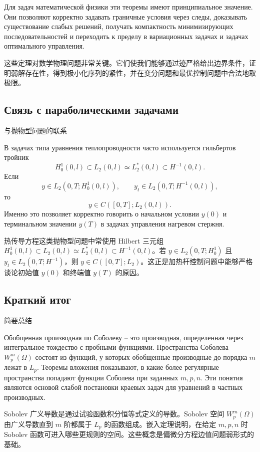 \documentclass[12pt,a4paper]{article}
\newcommand{\zh}[1]{\par\noindent #1\par}
\begin{document}
Для задач математической физики эти теоремы имеют принципиальное значение. Они позволяют корректно задавать граничные условия через следы, доказывать существование слабых решений, получать компактность минимизирующих последовательностей и переходить к пределу в вариационных задачах и задачах оптимального управления.
\zh{这些定理对数学物理问题非常关键。它们使我们能够通过迹严格给出边界条件，证明弱解存在性，得到极小化序列的紧性，并在变分问题和最优控制问题中合法地取极限。}

\subsection*{Связь с параболическими задачами}
\zh{与抛物型问题的联系}
В задачах типа уравнения теплопроводности часто используется гильбертов тройник
\[
H_0^1(0,l)\subset L_2(0,l)\simeq L_2^*(0,l)\subset H^{-1}(0,l).
\]
Если
\[
y\in L_2(0,T;H_0^1(0,l)),
\qquad
y_t\in L_2(0,T;H^{-1}(0,l)),
\]
то
\[
y\in C([0,T];L_2(0,l)).
\]
Именно это позволяет корректно говорить о начальном условии \(y(0)\) и терминальном значении \(y(T)\) в задачах управления нагревом стержня.
\zh{热传导方程这类抛物型问题中常使用 Hilbert 三元组 \(H_0^1(0,l)\subset L_2(0,l)\simeq L_2^*(0,l)\subset H^{-1}(0,l)\)。若 \(y\in L_2(0,T;H_0^1)\) 且 \(y_t\in L_2(0,T;H^{-1})\)，则 \(y\in C([0,T];L_2)\)。这正是加热杆控制问题中能够严格谈论初始值 \(y(0)\) 和终端值 \(y(T)\) 的原因。}

\subsection*{Краткий итог}
\zh{简要总结}
Обобщенная производная по Соболеву -- это производная, определенная через интегральное тождество с пробными функциями. Пространства Соболева \(W_p^m(\Omega)\) состоят из функций, у которых обобщенные производные до порядка \(m\) лежат в \(L_p\). Теоремы вложения показывают, в какие более регулярные пространства попадают функции Соболева при заданных \(m,p,n\). Эти понятия являются основой слабой постановки краевых задач для уравнений в частных производных.
\zh{Sobolev 广义导数是通过试验函数积分恒等式定义的导数。Sobolev 空间 \(W_p^m(\Omega)\) 由广义导数直到 \(m\) 阶都属于 \(L_p\) 的函数组成。嵌入定理说明，在给定 \(m,p,n\) 时 Sobolev 函数可进入哪些更规则的空间。这些概念是偏微分方程边值问题弱形式的基础。}

\newpage

\end{document}
